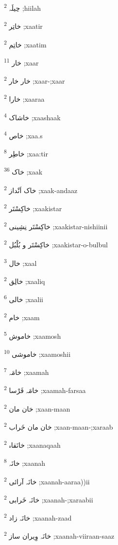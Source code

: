\documentclass[12pt]{article}
\begin{document}
\begin{RTL}
\begin{multicols}{5}
{\ur حِیلَہ}   \textsuperscript{2} ;hiilah

{\ur خاتِر}   \textsuperscript{2} ;xaatir

{\ur خاتِم}   \textsuperscript{2} ;xaatim

{\ur خار}   \textsuperscript{11} ;xaar

{\ur خار خار}   \textsuperscript{2} ;xaar-;xaar

{\ur خارا}   \textsuperscript{2} ;xaaraa

{\ur خاشاک}   \textsuperscript{4} ;xaashaak

{\ur خاص}   \textsuperscript{4} ;xaa.s

{\ur خاطِر}   \textsuperscript{8} ;xaa:tir

{\ur خاک}   \textsuperscript{36} ;xaak

{\ur خاک اَنْداز}   \textsuperscript{2} ;xaak-andaaz

{\ur خاکِسْتَر}   \textsuperscript{2} ;xaakistar

{\ur خاکِسْتَر نِشِینی}   \textsuperscript{2} ;xaakistar-nishiinii

{\ur خاکِسْتَر و بُلْبُل}   \textsuperscript{2} ;xaakistar-o-bulbul

{\ur خال}   \textsuperscript{3} ;xaal

{\ur خالِق}   \textsuperscript{2} ;xaaliq

{\ur خالی}   \textsuperscript{6} ;xaalii

{\ur خام}   \textsuperscript{2} ;xaam

{\ur خاموش}   \textsuperscript{5} ;xaamosh

{\ur خاموشی}   \textsuperscript{10} ;xaamoshii

{\ur خامَہ}   \textsuperscript{7} ;xaamah

{\ur خامَہ فَرْسا}   \textsuperscript{2} ;xaamah-farsaa

{\ur خان مان}   \textsuperscript{2} ;xaan-maan

{\ur خان مان خَراب}   \textsuperscript{2} ;xaan-maan-;xaraab

{\ur خانَقاہ}   \textsuperscript{2} ;xaanaqaah

{\ur خانَہ}   \textsuperscript{8} ;xaanah

{\ur خانَہ آرائی}   \textsuperscript{2} ;xaanah-aaraa))ii

{\ur خانَہ خَرابی}   \textsuperscript{2} ;xaanah-;xaraabii

{\ur خانَہ زاد}   \textsuperscript{2} ;xaanah-zaad

{\ur خانَہ وِیران ساز}   \textsuperscript{2} ;xaanah-viiraan-saaz


\end{multicols}
\end{RTL}
\end{document}

